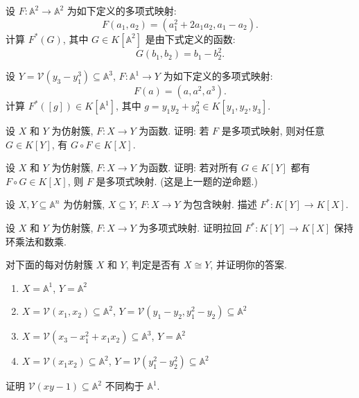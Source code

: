 \BookExerciseHeading
\begin{BookExercises}
  \item\label{ex:compute-pullback-quadratic} 设 $F:\mathbb{A}^{2}\to\mathbb{A}^{2}$ 为如下定义的多项式映射:
    \[
      F(a_{1},a_{2})=(a_{1}^{2}+2a_{1}a_{2},a_{1}-a_{2}).
    \]
    计算 $F^{*}(G)$, 其中 $G\in K[\mathbb{A}^{2}]$ 是由下式定义的函数:
    \[
      G(b_{1},b_{2})=b_{1}-b_{2}^{2}.
    \]
  \item\label{ex:compute-pullback-to-parametrized-line} 设 $Y=\mathcal{V}(y_{3}-y_{1}^{3})\subseteq\mathbb{A}^{3}$, $F:\mathbb{A}^{1}\to Y$ 为如下定义的多项式映射:
    \[
      F(a)=(a,a^{2},a^{3}).
    \]
    计算 $F^{*}([g])\in K[\mathbb{A}^{1}]$, 其中 $g=y_{1}y_{2}+y_{3}^{2}\in K[y_{1},y_{2},y_{3}]$.
  \item\label{ex:composing-with-polynomial-map} 设 $X$ 和 $Y$ 为仿射簇, $F:X\to Y$ 为函数. 证明: 若 $F$ 是多项式映射, 则对任意 $G\in K[Y]$, 有 $G\circ F\in K[X]$.
  \item\label{ex:converse-polynomial-composition} 设 $X$ 和 $Y$ 为仿射簇, $F:X\to Y$ 为函数. 证明: 若对所有 $G\in K[Y]$ 都有 $F\circ G\in K[X]$, 则 $F$ 是多项式映射. (这是上一题的逆命题.)
  \item\label{ex:pullback-of-inclusion} 设 $X,Y\subseteq\mathbb{A}^{n}$ 为仿射簇, $X\subseteq Y$, $F:X\to Y$ 为包含映射. 描述 $F^{*}:K[Y]\to K[X]$.
  \item\label{ex:pullback-preserves-multiplications} 设 $X$ 和 $Y$ 为仿射簇, $F:X\to Y$ 为多项式映射. 证明拉回 $F^{*}:K[Y]\to K[X]$ 保持环乘法和数乘.
  \item\label{ex:decide-variety-isomorphisms} 对下面的每对仿射簇 $X$ 和 $Y$, 判定是否有 $X\cong Y$, 并证明你的答案.
    \begin{enumerate}[label=(\alph*)]
      \item $X=\mathbb{A}^{1}$, $Y=\mathbb{A}^{2}$
      \item $X=\mathcal{V}(x_{1},x_{2})\subseteq\mathbb{A}^{2}$, $Y=\mathcal{V}(y_{1}-y_{2},y_{1}^{2}-y_{2})\subseteq\mathbb{A}^{2}$
      \item $X=\mathcal{V}(x_{3}-x_{1}^{2}+x_{1}x_{2})\subseteq\mathbb{A}^{3}$, $Y=\mathbb{A}^{2}$
      \item $X=\mathcal{V}(x_{1}x_{2})\subseteq\mathbb{A}^{2}$, $Y=\mathcal{V}(y_{1}^{2}-y_{2}^{2})\subseteq\mathbb{A}^{2}$
    \end{enumerate}
  \item\label{ex:hyperbola-not-isomorphic-to-line} 证明 $\mathcal{V}(xy-1)\subseteq\mathbb{A}^{2}$ 不同构于 $\mathbb{A}^{1}$.

\end{BookExercises}
